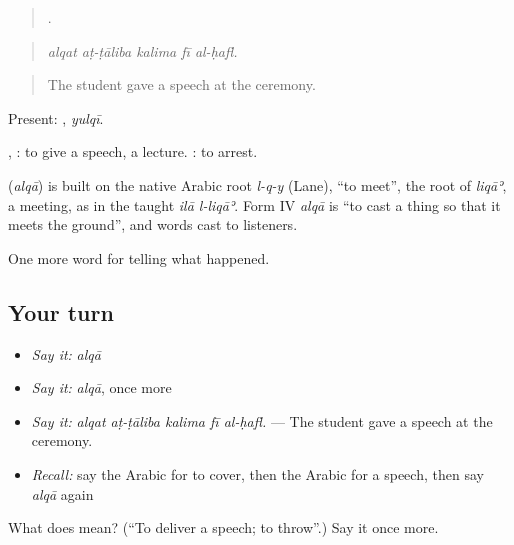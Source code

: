 \begin{quote}
    .
\end{quote}

\begin{quote}
\emph{alqat aṭ-ṭāliba kalima fī al-ḥafl.}
\end{quote}

\begin{quote}
The student gave a speech at the ceremony.
\end{quote}

Present: , \emph{yulqī}.

 , : to give a speech, a lecture.   : to arrest.

\begin{cousinweb}
\textbf{} (\emph{alqā}) is built on the native Arabic root \emph{l-q-y} (Lane), \textquotedblleft{}to meet\textquotedblright{}, the root of \emph{liqāʾ}, a meeting, as in the taught \emph{ilā l-liqāʾ}. Form IV \emph{alqā} is \textquotedblleft{}to cast a thing so that it meets the ground\textquotedblright{}, and words cast to listeners.
\end{cousinweb}

\begin{grammarlens}[title={What you've built}]
One more word for telling what happened.
\end{grammarlens}

\subsection*{Your turn}
\begin{itemize}
\raggedright
  \item \emph{Say it:} \emph{alqā}
  \item \emph{Say it:} \emph{alqā}, once more
  \item \emph{Say it:} \emph{alqat aṭ-ṭāliba kalima fī al-ḥafl.} — The student gave a speech at the ceremony.
  \item \emph{Recall:} say the Arabic for to cover, then the Arabic for a speech, then say \emph{alqā} again
\end{itemize}

\begin{tcolorbox}[breakable,colback=teal!4,colframe=teal!35!black,title={Before you move on}]
What does  mean? (\textquotedblleft{}To deliver a speech; to throw\textquotedblright{}.) Say it once more.
\end{tcolorbox}
